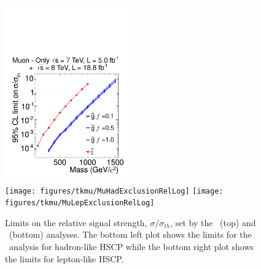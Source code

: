 \begin{figure}
\centering
  \includegraphics[clip=false, trim=0.0cm 0cm 0.0cm 0cm, width=0.48\textwidth]{figures/muonly/MOExclusionRelLog} \\
  \texttt{[image: figures/tkmu/MuHadExclusionRelLog]}
  \texttt{[image: figures/tkmu/MuLepExclusionRelLog]} \\
\caption[Limits on the relative signal strength, $\sigma/\sigma_{th}$, set by the \muononly\ and \tktof\ analyses]
{Limits on the relative signal strength, $\sigma/\sigma_{th}$,  set by the \muononly\ (top) and \tktof\ (bottom) analyses.
The bottom left plot shows the limits for the \tktof\ analysis for hadron-like HSCP while the bottom right plot shows the limits for lepton-like HSCP.
}
    \label{fig:MuRelExclusion}
\end{figure}

